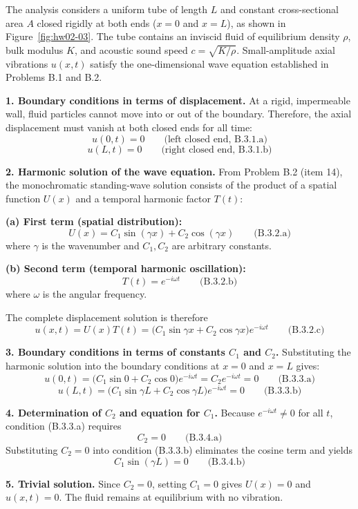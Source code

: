 The analysis considers a uniform tube of length $L$ and constant cross-sectional area $A$ closed rigidly at both ends ($x=0$ and $x=L$), as shown in Figure~\ref{fig:hw02-03}. The tube contains an inviscid fluid of equilibrium density $\rho$, bulk modulus $K$, and acoustic sound speed $c=\sqrt{K/\rho}$. Small-amplitude axial vibrations $u(x,t)$ satisfy the one-dimensional wave equation established in Problems B.1 and B.2.

\textbf{1. Boundary conditions in terms of displacement.} At a rigid, impermeable wall, fluid particles cannot move into or out of the boundary. Therefore, the axial displacement must vanish at both closed ends for all time:
\[
\boxed{u(0,t)=0}\qquad\text{(left closed end, B.3.1.a)}
\]
\[
\boxed{u(L,t)=0}\qquad\text{(right closed end, B.3.1.b)}
\]

\textbf{2. Harmonic solution of the wave equation.} From Problem B.2 (item 14), the monochromatic standing-wave solution consists of the product of a spatial function $U(x)$ and a temporal harmonic factor $T(t)$:

\textbf{(a) First term (spatial distribution):}
\[
\boxed{U(x)=C_1\sin(\gamma x)+C_2\cos(\gamma x)}\qquad\text{(B.3.2.a)}
\]
where $\gamma$ is the wavenumber and $C_1, C_2$ are arbitrary constants.

\textbf{(b) Second term (temporal harmonic oscillation):}
\[
\boxed{T(t)=e^{-i\omega t}}\qquad\text{(B.3.2.b)}
\]
where $\omega$ is the angular frequency.

The complete displacement solution is therefore
\[
\boxed{u(x,t)=U(x)T(t)=\bigl(C_1\sin\gamma x+C_2\cos\gamma x\bigr)e^{-i\omega t}}\qquad\text{(B.3.2.c)}
\]

\textbf{3. Boundary conditions in terms of constants $C_1$ and $C_2$.} Substituting the harmonic solution into the boundary conditions at $x=0$ and $x=L$ gives:
\[
u(0,t)=\bigl(C_1\sin 0+C_2\cos 0\bigr)e^{-i\omega t}=C_2e^{-i\omega t}=0\qquad\text{(B.3.3.a)}
\]
\[
u(L,t)=\bigl(C_1\sin\gamma L+C_2\cos\gamma L\bigr)e^{-i\omega t}=0\qquad\text{(B.3.3.b)}
\]

\textbf{4. Determination of $C_2$ and equation for $C_1$.} Because $e^{-i\omega t}\neq 0$ for all $t$, condition (B.3.3.a) requires
\[
\boxed{C_2=0}\qquad\text{(B.3.4.a)}
\]
Substituting $C_2=0$ into condition (B.3.3.b) eliminates the cosine term and yields
\[
\boxed{C_1\sin(\gamma L)=0}\qquad\text{(B.3.4.b)}
\]

\textbf{5. Trivial solution.} Since $C_2=0$, setting $C_1=0$ gives $U(x)=0$ and $u(x,t)=0$. The fluid remains at equilibrium with no vibration.

